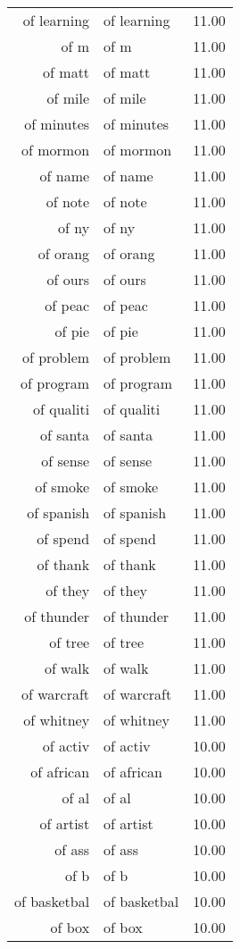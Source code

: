 \begin{table}[ht]
\begin{tabular}{rlr}
  of learning & of learning & 11.00 \\ 
  of m & of m & 11.00 \\ 
  of matt & of matt & 11.00 \\ 
  of mile & of mile & 11.00 \\ 
  of minutes & of minutes & 11.00 \\ 
  of mormon & of mormon & 11.00 \\ 
  of name & of name & 11.00 \\ 
  of note & of note & 11.00 \\ 
  of ny & of ny & 11.00 \\ 
  of orang & of orang & 11.00 \\ 
  of ours & of ours & 11.00 \\ 
  of peac & of peac & 11.00 \\ 
  of pie & of pie & 11.00 \\ 
  of problem & of problem & 11.00 \\ 
  of program & of program & 11.00 \\ 
  of qualiti & of qualiti & 11.00 \\ 
  of santa & of santa & 11.00 \\ 
  of sense & of sense & 11.00 \\ 
  of smoke & of smoke & 11.00 \\ 
  of spanish & of spanish & 11.00 \\ 
  of spend & of spend & 11.00 \\ 
  of thank & of thank & 11.00 \\ 
  of they & of they & 11.00 \\ 
  of thunder & of thunder & 11.00 \\ 
  of tree & of tree & 11.00 \\ 
  of walk & of walk & 11.00 \\ 
  of warcraft & of warcraft & 11.00 \\ 
  of whitney & of whitney & 11.00 \\ 
  of activ & of activ & 10.00 \\ 
  of african & of african & 10.00 \\ 
  of al & of al & 10.00 \\ 
  of artist & of artist & 10.00 \\ 
  of ass & of ass & 10.00 \\ 
  of b & of b & 10.00 \\ 
  of basketbal & of basketbal & 10.00 \\ 
  of box & of box & 10.00 \\ 

\end{tabular}
\end{table}
